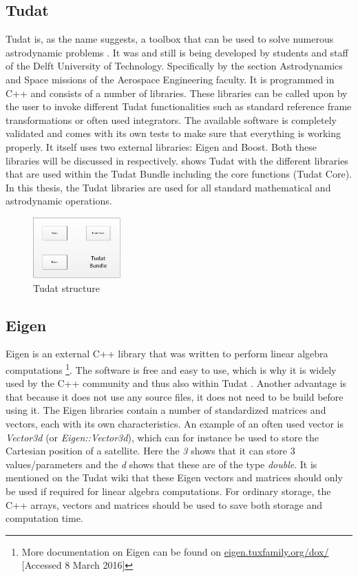 \subsection{\ac{Tudat}}
\label{subsec:tudat}
\ac{Tudat} is, as the name suggests, a toolbox that can be used to solve numerous astrodynamic problems \citep{dirkx2016tudat}. It was and still is being developed by students and staff of the Delft University of Technology. Specifically by the section Astrodynamics and Space missions of the Aerospace Engineering faculty. It is programmed in C++ and consists of a number of libraries. These libraries can be called upon by the user to invoke different \ac{Tudat} functionalities such as standard reference frame transformations or often used integrators. The available software is completely validated and comes with its own tests to make sure that everything is working properly. It itself uses two external libraries: Eigen and Boost. Both these libraries will be discussed in  respectively.  shows \ac{Tudat} with the different libraries that are used within the \ac{Tudat} Bundle including the core functions (\ac{Tudat} Core).
In this thesis, the \ac{Tudat} libraries are used for all standard mathematical and astrodynamic operations.

\begin{figure}[!ht]
\centering
\includegraphics[width=0.3\textwidth]{figures/software/tudatBlock.png}
\caption{\ac{Tudat} structure}
\label{fig:tudatBlock}
\end{figure}

\subsection{Eigen}
\label{subsec:eigen}
Eigen is an external C++ library that was written to perform linear algebra computations \footnote{More documentation on Eigen can be found on \url{eigen.tuxfamily.org/dox/} [Accessed 8 March 2016] }. The software is free and easy to use, which is why it is widely used by the C++ community and thus also within \ac{Tudat} \citep{dirkx2016tudat}. Another advantage is that because it does not use any source files, it does not need to be build before using it. 
The Eigen libraries contain a number of standardized matrices and vectors, each with its own characteristics. An example of an often used vector is \textit{Vector3d} (or \textit{Eigen::Vector3d}), which can for instance be used to store the Cartesian position of a satellite. Here the \textit{3} shows that it can store 3 values/parameters and the \textit{d} shows that these are of the type \textit{double}. It is mentioned on the \ac{Tudat} wiki \citep{dirkx2016tudat} that these Eigen vectors and matrices should only be used if required for linear algebra computations. For ordinary storage, the C++ arrays, vectors and matrices should be used to save both storage and computation time.



